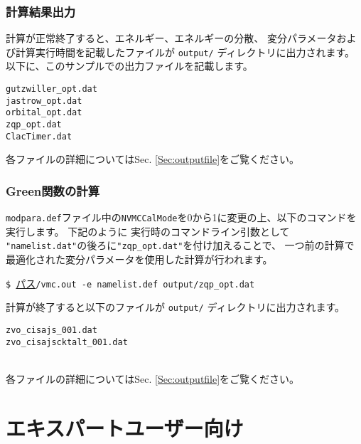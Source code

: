 \subsubsection{計算結果出力}
計算が正常終了すると、エネルギー、エネルギーの分散、
変分パラメータおよび計算実行時間を記載したファイルが
\verb|output/| ディレクトリに出力されます。
以下に、このサンプルでの出力ファイルを記載します。\\
\begin{minipage}{12cm}
\begin{screen}
\begin{verbatim}
gutzwiller_opt.dat
jastrow_opt.dat
orbital_opt.dat
zqp_opt.dat
ClacTimer.dat
\end{verbatim}
\end{screen}
\end{minipage}

各ファイルの詳細についてはSec. \ref{Sec:outputfile}をご覧ください。

\subsubsection{Green関数の計算}

\verb|modpara.def|ファイル中の\verb|NVMCCalMode|を0から1に変更の上、以下のコマンドを実行します。
下記のように
実行時のコマンドライン引数として
\verb|"namelist.dat"|の後ろに\verb|"zqp_opt.dat"|を付け加えることで、
一つ前の計算で最適化された変分パラメータを使用した計算が行われます。

\vspace{1cm}\hspace{-0.7cm}
\verb|$ |\underline{パス}\verb|/vmc.out -e namelist.def output/zqp_opt.dat|
\small

計算が終了すると以下のファイルが \verb|output/| ディレクトリに出力されます。
\\
\begin{minipage}{12cm}
\begin{screen}
\begin{verbatim}
zvo_cisajs_001.dat
zvo_cisajscktalt_001.dat
\end{verbatim}
\end{screen}
\end{minipage}
\\
各ファイルの詳細についてはSec. \ref{Sec:outputfile}をご覧ください。

\section{エキスパートユーザー向け}

